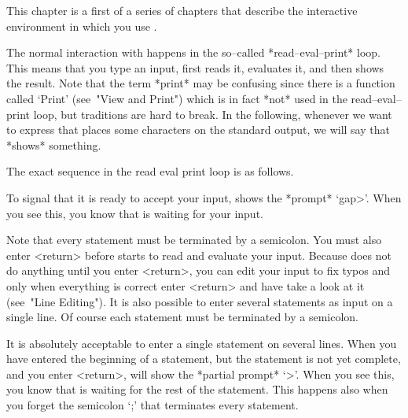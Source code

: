 %
%
%
%

This chapter is a first of a series of chapters that describe the
interactive environment in which you use {\GAP}.


The normal interaction with {\GAP} happens in the so--called
*read--eval--print* loop.
This means that you type an input, {\GAP} first reads it,
evaluates it, and then shows the result.
Note that the term *print* may be confusing since there is a {\GAP}
function called `Print' (see~"View and Print") which is in fact *not*
used in the read--eval--print loop, but traditions are hard to break.
In the following, whenever we want to express that {\GAP} places some
characters on the standard output, we will say that {\GAP} *shows*
something.

The exact sequence in the read eval print loop is as follows.

To signal that it is ready to accept your input,
{\GAP} shows the *prompt* `gap>'.
When you see this, you know that {\GAP} is waiting for your input.

Note that every statement must be terminated by a semicolon. You must
also enter <return> before {\GAP} starts to read and evaluate your input.
Because {\GAP} does not do anything until you enter <return>, you can
edit your input to fix typos and only when everything is correct enter
<return> and have {\GAP} take a look at it (see~"Line Editing"). It is
also possible to enter several statements as input on a single line. Of
course each statement must be terminated by a semicolon.

It is absolutely acceptable to enter a single statement on several lines.
When you have entered the beginning of a statement, but the statement is
not yet complete, and you enter <return>,
{\GAP} will show the *partial prompt* `>'.
When you see this, you know that {\GAP} is waiting for the rest
of the statement. This happens also when you forget
the semicolon `;' that terminates every {\GAP} statement.

